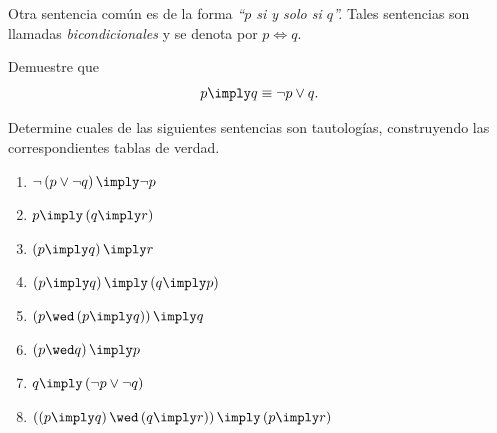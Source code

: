  Otra sentencia común es de la forma \emph{``$p$ si y solo si $q$''.}  Tales sentencias son llamadas \emph{bicondicionales} y se denota por 
 $
 p \iff q.
 $ 







 \begin{ejemplo}
  Demuestre que $$p\imply q \equiv \neg p \vee q.$$
 \end{ejemplo}




 \begin{ejemplo} Determine cuales de las siguientes sentencias son tautologías, construyendo las correspondientes tablas de verdad.
  \begin{enumerate}
   \item $\neg\left( p \vee \neg q \right) \imply \neg p$
   \item $p \imply \left( q\imply r \right)$
   \item $\left( p \imply q \right)\imply r$
   \item $\left( p\imply q \right) \imply \left( q\imply p \right)$
   \item $\left( p \wed \left( p \imply q \right) \right) \imply q$
   \item $\left( p \wed q \right) \imply p$
   \item $q \imply \left( \neg p \vee \neg q \right)$
   \item $\left( \left( p\imply q \right) \wed \left( q \imply r \right) \right) \imply \left( p \imply r \right)$
  \end{enumerate}

 \end{ejemplo}



